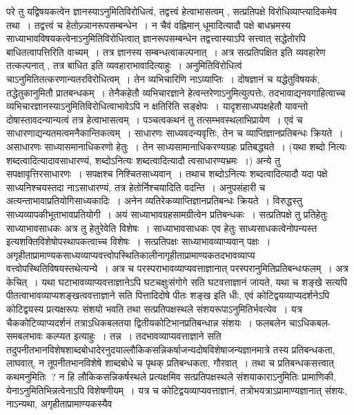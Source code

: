 परे तु यद्विषयकत्वेन ज्ञानस्याऽनुमितिविरोधित्वं, तद्वत्त्वं हेत्वाभासत्वम् , सत्प्रतिपक्षे विरोधिव्याप्त्यादिकमेव तथा~। तद्वत्त्वं च हेतोज्र्ञानरूपसम्बन्धेन~। न चैवं
वह्निमान् धूमादित्यादौ पक्षे बाधभ्रमस्य साध्याभावविषयकत्वेनाऽनुमितिविरोधित्वात् ज्ञानरूपसम्बन्धेन तद्वत्त्वास्याऽपि सत्त्वात् सद्धेतोरपि बाधितत्वापत्तिरिति वाच्यम्~।
तत्र ज्ञानस्य सम्बन्धत्वाकल्पनात्~। अत्र सत्प्रतिपक्षित इति व्यवहारेण तत्कल्पनात् , तत्र बाधित इति व्यवहाराभावादित्याहुः~।
अनुमितिविरोधित्वं चाऽनुमितितत्करणान्यतरविरोधित्वम्~। तेन व्यभिचारिणि नाऽव्याप्तिः~।
दोषज्ञानं च यद्धेतुविषयकं, तद्धेतुकानुमितौ प्रातबन्धकम्~। तेनैकहेतौ व्यभिचारज्ञाने हेत्वन्तरेणाऽनुमित्युत्पत्तेः, तदभावाद्यनवगाहित्वाच्च
व्यभिचारज्ञानस्याऽनुमितिविरोधित्वाभावेऽपि न क्षतिरिति सङ्क्षेपः~।
यादृशसाध्यपक्षहेतौ यावन्तो दोषास्तावदन्यान्यत्वं तत्र हेत्वाभासत्वम्~। पञ्चत्वकथनं तु तत्सम्भवस्थलाभिप्रायेण~।
एवं च साधारणाद्यन्यतमत्वमनैकान्तिकत्वम्~।
साधारणः साध्यवदन्यवृत्तिः, तेन च व्याप्तिज्ञानप्रतिबन्धः क्रियते~।
असाधारणः साध्यासमानाधिकरणो हेतुः~। तेन साध्यसामानाधिकरण्यग्रहः प्रतिबद्ध्यते~। (यथा शब्दो नित्यः शब्दत्वादित्यादावसाधारण्यं, शब्दोऽनित्यः शब्दत्वादित्यादौ
त्वसाधारण्यभ्रमः~।)
अन्ये तु सपक्षावृत्तिरसाधारणः~। सपक्षश्च निश्चितसाध्यवान्~। तथाच शब्दोऽनित्यः शब्दत्वादित्यादौ यदा पक्षे साध्यनिश्चयस्तदा नाऽसाधारण्यं, तत्र हेतोर्निश्चयादिति
वदन्ति~।
अनुपसंहारी च अत्यन्ताभावाप्रतियोगिसाध्यकादिः~। अनेन व्यतिरेकव्याप्तिज्ञानप्रतिबन्धः क्रियते~।
विरुद्धस्तु साध्यव्यापकीभूताभावप्रतियोगी~। अयं साध्याभावग्रहसामग्रीत्वेन प्रतिबन्धकः~। सत्प्रतिपक्षे तु प्रतिहेतुः साध्याभावसाधकः अत्र तु हेतुरेवेति विशेषः~।
साध्याभावसाधकः एव हेतुः साध्यसाधकत्वेनोपन्यस्त इत्यशक्तिविशेषोपस्थापकत्वाच्च विशेषः~।
सत्प्रतिपक्षः साध्याभावव्याप्यवान् पक्षः~।
अगृहीताप्रामाण्यकसाध्यव्याप्यवत्त्वोपस्थितिकालीनागृहीताप्रामाण्यकतदभावव्याप्य वत्त्वोपस्थितिविषयस्तथेत्यन्ये~। अत्र च परस्पराभावव्याप्यवत्ताज्ञानात्
परस्परानुमितिप्रतिबन्धःफलम्~।
अत्र केचित्~। यथा घटाभावव्याप्यवत्ताज्ञानेऽपि घटचक्षुःसंगोगे सति घटवत्ताज्ञानं जायते, यथा च शङ्खे सत्यपि पीतत्वाभावव्याप्यशङ्खत्ववत्ताज्ञाने सति
पित्तादिदोषे पीतः शङ्ख इति धीः, एवं कोटिद्वयव्याप्यदर्शनेऽपि कोटिद्वयस्य प्रत्यक्षरूपः संशयो भवति तथा सत्प्रतिपक्षस्थले संशयरूपाऽनुमितिर्भवत्येव~। यत्र
चैककोटिव्याप्यदर्शनं तत्राऽधिकबलतया द्वितीयकोटिभानप्रतिबन्धान्न संशयः~। फलबलेन चाऽधिकबल-समबलभावः कल्प्यत इत्याहुः~।
तन्न~। तदभावव्याप्यवत्ताज्ञाने सति तदुपनीतभानविशेषशाब्दबोधादेरनुदयाल्लौकिकसन्निकर्षाजन्यदोषविशेषाजन्यज्ञानमात्रे तस्य प्रतिबन्धकता, लाघवात्, न
तूपनीतभानविशेषे शाब्दबोधे च पृथक् प्रतिबन्धकता, गौरवात्~। तथा च प्रतिबन्धकसत्त्वात् कथमनुमितिः~? न हि लौकिकसन्निकर्षस्थले प्रत्यक्षमिव सत्प्रतिपक्षस्थले
संशयाकाराऽनुमितिः प्रामाणिकी, येनाऽनुमितिभिन्नत्वेनाऽपि विशेषणीयम्~। यत्र च कोटिद्वयव्याप्यवत्ताज्ञानं, तत्रोभयत्राऽप्रामाण्यज्ञानात् संशयः, नाऽन्यथा, अगृहीताप्रामाण्यकस्यैव
